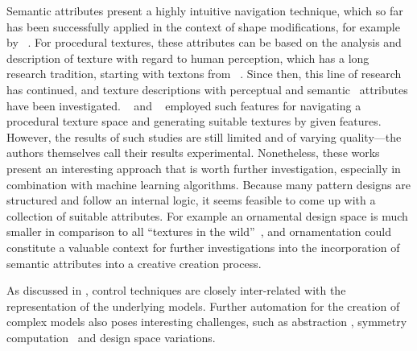 Semantic attributes present a highly intuitive navigation technique, which so far has been successfully applied in the context of shape modifications, for example by \citeauthor*{yumer_2015_sse}~\cite{yumer_2015_sse}. For procedural textures, these attributes can be based on the analysis and description of texture with regard to human perception, which has a long research tradition, starting with textons from \citeauthor*{julesz_1981_tte}~\cite{julesz_1981_tte}. 
Since then, this line of research has continued, and texture descriptions with perceptual \cite{liu_2015_vpp} and semantic~\cite{matthews_2013_eta,cimpoi_2014_dtw} attributes have been investigated. \citeauthor*{dong_2017_ptg}~\cite{dong_2017_ptg} and \citeauthor*{liu_2018_ppt}~\cite{liu_2018_ppt} employed such features for navigating a procedural texture space and generating suitable textures by given features. However, the results of such studies are still limited and of varying quality---the authors themselves \cite{liu_2018_ppt} call their results experimental. Nonetheless, these works present an interesting approach that is worth further investigation, especially in combination with machine learning algorithms. Because many pattern designs are structured and follow an internal logic, it seems feasible to come up with a collection of suitable attributes. For example an ornamental design space is much smaller in comparison to all ``textures in the wild''~\cite{cimpoi_2014_dtw}, and ornamentation could constitute a valuable context for further investigations into the incorporation of semantic attributes into a creative creation process.

As discussed in , control techniques are closely inter-related with the representation of the underlying models. 
Further automation for the creation of complex models also poses interesting challenges, such as abstraction \cite{nan_2011_cgr}, symmetry computation~\cite{cullen_2011_sh} and design space variations.